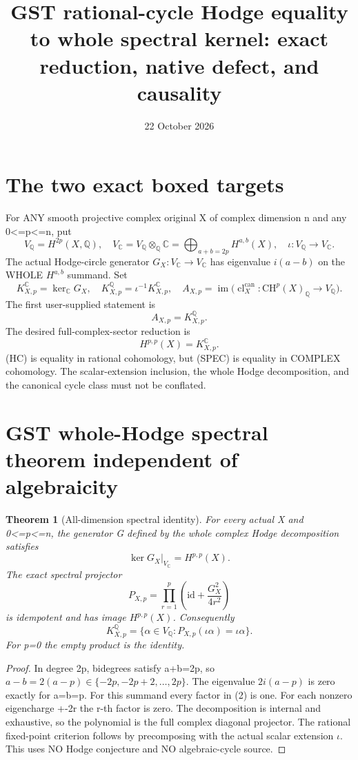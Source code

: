 \documentclass[11pt]{article}
\title{GST rational-cycle Hodge equality to whole spectral kernel:
exact reduction, native defect, and causality}
\date{22 October 2026}
\newtheorem{theorem}{Theorem}
\newcommand{\QQ}{\mathbb Q}
\newcommand{\CC}{\mathbb C}
\newcommand{\CH}{\mathrm{CH}}
\newcommand{\im}{\operatorname{im}}
\newcommand{\cl}{\operatorname{cl}}
\newcommand{\Id}{\mathrm{id}}
\begin{document}
\maketitle

\section{The two exact boxed targets}
For ANY smooth projective complex original X of complex dimension n
and any 0<=p<=n, put
\[
 V_{\QQ}=H^{2p}(X,\QQ),\quad
 V_{\CC}=V_{\QQ}\otimes_{\QQ}\CC
        =\bigoplus_{a+b=2p}H^{a,b}(X),
 \quad \iota:V_{\QQ}\to V_{\CC}.
\]
The actual Hodge-circle generator \(G_X:V_{\CC}\to V_{\CC}\)
has eigenvalue \(i(a-b)\) on the WHOLE \(H^{a,b}\) summand.
Set
\[
 K^\CC_{X,p}=\ker_{\CC}G_X,\quad
 K^\QQ_{X,p}=\iota^{-1}K^\CC_{X,p},\quad
 A_{X,p}=\im\bigl(\cl_X^{\mathrm{can}}:
                      \CH^p(X)_{\QQ}\to V_{\QQ}\bigr).
\]
The first user-supplied statement is
\[
 \boxed{A_{X,p}=K^\QQ_{X,p}.}\tag{HC}
\]
The desired full-complex-sector reduction is
\[
 \boxed{H^{p,p}(X)=K^\CC_{X,p}.}\tag{SPEC}
\]
(HC) is equality in rational cohomology, but (SPEC) is equality
in COMPLEX cohomology. The scalar-extension inclusion, the
whole Hodge decomposition, and the canonical cycle class must
not be conflated.

\section{GST whole-Hodge spectral theorem independent of algebraicity}
\begin{theorem}[All-dimension spectral identity]
For every actual X and 0<=p<=n, the generator G defined
by the whole complex Hodge decomposition satisfies
\[
 \boxed{\ker G_X|_{V_{\CC}}=H^{p,p}(X).}          \tag{1}
\]
The exact spectral projector
\[
 \boxed{P_{X,p}=\prod_{r=1}^{p}
                 \left(\Id+\frac{G_X^2}{4r^2}\right)}
                                                               \tag{2}
\]
is idempotent and has image \(H^{p,p}(X)\).
Consequently
\[
 \boxed{K^\QQ_{X,p}
       =\{\alpha\in V_\QQ:
           P_{X,p}(\iota\alpha)=\iota\alpha\}.}  \tag{3}
\]
For p=0 the empty product is the identity.
\end{theorem}
\begin{proof}
In degree 2p, bidegrees satisfy a+b=2p,
so \(a-b=2(a-p)\in\{-2p,-2p+2,\ldots,2p\}\).
The eigenvalue \(2i(a-p)\) is zero exactly for a=b=p.
For this summand every factor in (2) is one.
For each nonzero eigencharge +-2r the r-th factor is zero.
The decomposition is internal and exhaustive, so the
polynomial is the full complex diagonal projector.
The rational fixed-point criterion follows by
precomposing with the actual scalar extension \(\iota\).
This uses NO Hodge conjecture and NO algebraic-cycle source.
\end{proof}
\end{document}
